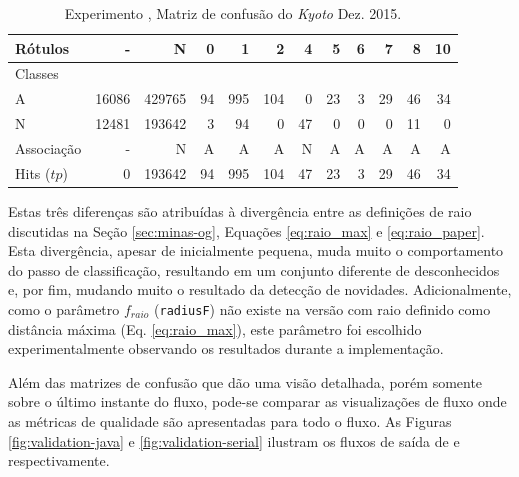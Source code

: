 \begin{table}[hbt]%
  \begin{center}
  \caption{Experimento \serial, Matriz de confusão do \dataset \emph{Kyoto} Dez. 2015.}
  \label{tab:libc-matrix}
  \begin{tabular}{l|r|r|r|r|r|r|r|r|r|r|r}
    Rótulos &      - &       N &   0 &    1 &    2 &   4 &   5 &  6 &   7 &   8 &  10 \\\hline
    Classes  &        &         &     &      &      &     &     &    &     &     &     \\\hline
    \hline
    A        &  16086 &  429765 &  94 &  995 &  104 &   0 &  23 &  3 &  29 &  46 &  34 \\\hline
    N        &  12481 &  193642 &   3 &   94 &    0 &  47 &   0 &  0 &   0 &  11 &   0 \\\hline
    \hline
    Associação &      - &       N &   A &    A &    A &   N &   A &  A &   A &   A &   A \\\hline
    Hits ($tp$)     &      0 &  193642 &  94 &  995 &  104 &  47 &  23 &  3 &  29 &  46 &  34 
  \end{tabular}
  \end{center}
\end{table}

Estas três diferenças são atribuídas à divergência entre as definições de raio
discutidas na Seção \ref{sec:minas-og}, Equações \ref{eq:raio_max} e
\ref{eq:raio_paper}.
Esta divergência, apesar de inicialmente pequena, muda muito o comportamento do
passo de classificação, resultando em um conjunto diferente de desconhecidos e, 
por fim, mudando muito o resultado da detecção de novidades.
Adicionalmente, como o parâmetro $f_{raio}$ (\texttt{radiusF}) não existe na
versão com raio definido como distância máxima (Eq. \ref{eq:raio_max}), este
parâmetro foi escolhido experimentalmente observando os resultados durante a
implementação.

Além das matrizes de confusão que dão uma visão detalhada, porém somente sobre o
último instante do fluxo, pode-se comparar as visualizações de fluxo onde as
métricas de qualidade são apresentadas para todo o fluxo.
As Figuras \ref{fig:validation-java} e \ref{fig:validation-serial} ilustram os
fluxos de saída de  e \serial respectivamente.

